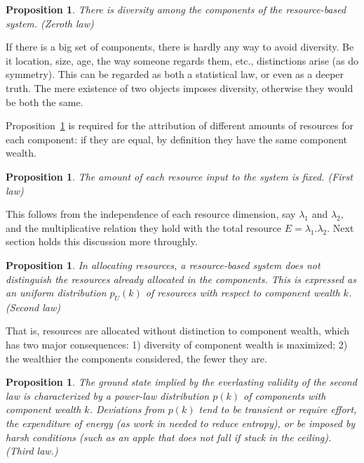 \documentclass[a4paper, 11pt]{article} %
\newtheorem{proposition}[theorem]{Proposition}
\begin{document}
\begin{proposition}\label{prop:0}
	There is diversity among the components of the resource-based system. (Zeroth law)
\end{proposition}

If there is a big set of components, there is hardly any way to avoid diversity. Be it location, size, age, the way someone regards them, etc., distinctions arise (as do symmetry). This can be regarded as both a statistical law, or even as a deeper truth.
The mere existence of two objects imposes diversity,
otherwise they would be both the same.

Proposition~\ref{prop:0} is required for the attribution of different amounts of resources for each component:
if they are equal, by definition they have the same component wealth.

\begin{proposition}\label{prop:1}
	The amount of each resource input to the system is fixed. (First law)
\end{proposition}

This follows from the independence of each resource dimension,
say $\lambda_1$ and $\lambda_2$, and
the multiplicative relation they hold with the total resource $E=\lambda_1 . \lambda_2$. Next section holds this discussion more throughly.

\begin{proposition}\label{prop:2}
	In allocating resources, a resource-based system does not distinguish the resources already allocated in the components. This is expressed as an uniform distribution $p_U(k)$ of resources with respect to component wealth $k$. (Second law)
\end{proposition}

That is, resources are allocated without distinction to component wealth, which has two major consequences: 1) diversity of component wealth is maximized; 2) the wealthier the components considered, the fewer they are. 

\begin{proposition}\label{prop:3}
	The ground state implied by the everlasting validity of the second law is characterized by
	a power-law distribution $p(k)$ of components with component wealth $k$. Deviations from $p(k)$ tend to be transient or require effort, the expenditure of energy (as work in needed to reduce entropy), or be imposed by harsh conditions (such as an apple that does not fall if stuck in the ceiling). (Third law.)
\end{proposition}
\end{document}
